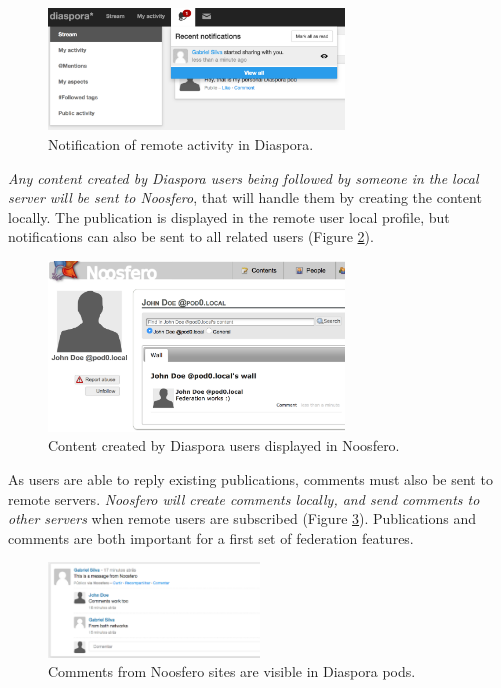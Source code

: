\begin{figure}[hbt]
  \centering
    \includegraphics[width=0.7\textwidth]{figures/diaspora_notification.eps}
  \caption{Notification of remote activity in Diaspora.}
  \label{fig:diaspora_notification}
\end{figure}

\textit{Any content created by Diaspora users being followed by someone in the
local server will be sent to Noosfero}, that will handle them by creating
the content locally. The publication is displayed in the remote user
local profile, but notifications can also be sent to all related users
(Figure \ref{fig:noosfero_remote_wall}).

\begin{figure}[hbt]
  \centering
    \includegraphics[width=0.7\textwidth]{figures/noosfero_remote_wall.eps}
  \caption{Content created by Diaspora users displayed in Noosfero.}
  \label{fig:noosfero_remote_wall}
\end{figure}

As users are able to reply existing publications, comments must also be sent
to remote servers. \textit{Noosfero will create comments locally, and send
comments to other servers} when remote users are subscribed (Figure
\ref{fig:comments}). Publications and comments are both important for a
first set of federation features.

\begin{figure}[hbt]
  \centering
    \includegraphics[width=0.5\textwidth]{figures/comments.eps}
  \caption{Comments from Noosfero sites are visible in Diaspora pods.}
  \label{fig:comments}
\end{figure}

